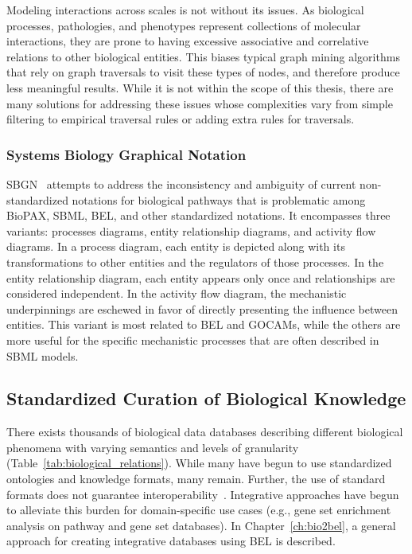 Modeling interactions across scales is not without its issues.
As biological processes, pathologies, and phenotypes represent collections of molecular interactions, they are prone to having excessive associative and correlative relations to other biological entities.
This biases typical graph mining algorithms that rely on graph traversals to visit these types of nodes, and therefore produce less meaningful results.
While it is not within the scope of this thesis, there are many solutions for addressing these issues whose complexities vary from simple filtering to empirical traversal rules or adding extra rules for traversals.

\subsubsection{Systems Biology Graphical Notation}

\ac{SBGN}~\cite{LeNovere2009} attempts to address the inconsistency and ambiguity of current non-standardized notations for biological pathways that is problematic among \ac{BioPAX}, \ac{SBML}, \ac{BEL}, and other standardized notations.
It encompasses three variants: processes diagrams, entity relationship diagrams, and activity flow diagrams.
In a process diagram, each entity is depicted along with its transformations to other entities and the regulators of those processes.
In the entity relationship diagram, each entity appears only once and relationships are considered independent.
In the activity flow diagram, the mechanistic underpinnings are eschewed in favor of directly presenting the influence between entities.
This variant is most related to \ac{BEL} and \acp{GOCAM}, while the others are more useful for the specific mechanistic processes that are often described in \ac{SBML} models.

\subsection{Standardized Curation of Biological Knowledge}
\label{subsec:standardized_curation}

There exists thousands of biological data databases describing different biological phenomena with varying semantics and levels of granularity (Table~\ref{tab:biological_relations}).
While many have begun to use standardized ontologies and knowledge formats, many remain.
Further, the use of standard formats does not guarantee interoperability~\cite{Domingo-Fernandez2019a}.
Integrative approaches have begun to alleviate this burden for domain-specific use cases (e.g., gene set enrichment analysis on pathway and gene set databases).
In Chapter~\ref{ch:bio2bel}, a general approach for creating integrative databases using BEL is described.

